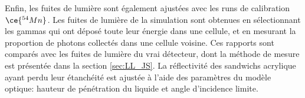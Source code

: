Enfin, les fuites de lumière sont également ajustées avec les runs de calibration $\ce{^{54}Mn}$. Les fuites de lumière de la simulation sont obtenues en sélectionnant les gammas qui ont déposé toute leur énergie dans une cellule, et en mesurant la proportion de photons collectés dans une cellule voisine. Ces rapports sont comparés avec les fuites de lumière du vrai détecteur, dont la méthode de mesure est présentée dans la section \ref{sec:LL_JS}. La réflectivité des sandwichs acrylique ayant perdu leur étanchéité est ajustée à l'aide des paramètres du modèle optique: hauteur de pénétration du liquide et angle d'incidence limite.

